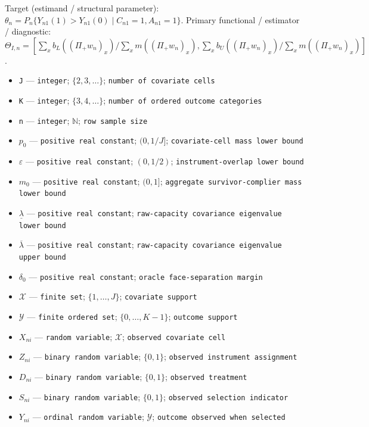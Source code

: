 \documentclass{article}
\begin{document}
Target (estimand / structural parameter): \(\theta_n=P_n\{Y_{n1}(1)>Y_{n1}(0)\mid C_{n1}=1,A_{n1}=1\}\).
Primary functional / estimator / diagnostic: \(\Theta_{I,n}=[\sum_x b_L((\Pi_+w_n)_x)/\sum_x m((\Pi_+w_n)_x),\sum_x b_U((\Pi_+w_n)_x)/\sum_x m((\Pi_+w_n)_x)]\).
\begin{itemize}
  \item \texttt{J} --- \texttt{integer}; \(\{2,3,\ldots\}\); \texttt{number of covariate cells}
  \item \texttt{K} --- \texttt{integer}; \(\{3,4,\ldots\}\); \texttt{number of ordered outcome categories}
  \item \texttt{n} --- \texttt{integer}; \(\mathbb N\); \texttt{row sample size}
  \item \(p_0\) --- \texttt{positive real constant}; \((0,1/J]\); \texttt{covariate-\allowbreak{}cell mass lower bound}
  \item \(\varepsilon\) --- \texttt{positive real constant}; \((0,1/2)\); \texttt{instrument-\allowbreak{}overlap lower bound}
  \item \(m_0\) --- \texttt{positive real constant}; \((0,1]\); \texttt{aggregate survivor-\allowbreak{}complier mass lower bound}
  \item \(\underline\lambda\) --- \texttt{positive real constant}; \texttt{raw-\allowbreak{}capacity covariance eigenvalue lower bound}
  \item \(\overline\lambda\) --- \texttt{positive real constant}; \texttt{raw-\allowbreak{}capacity covariance eigenvalue upper bound}
  \item \(\delta_0\) --- \texttt{positive real constant}; \texttt{oracle face-\allowbreak{}separation margin}
  \item \(\mathcal X\) --- \texttt{finite set}; \(\{1,\ldots,J\}\); \texttt{covariate support}
  \item \(\mathcal Y\) --- \texttt{finite ordered set}; \(\{0,\ldots,K-1\}\); \texttt{outcome support}
  \item \(X_{ni}\) --- \texttt{random variable}; \(\mathcal X\); \texttt{observed covariate cell}
  \item \(Z_{ni}\) --- \texttt{binary random variable}; \(\{0,1\}\); \texttt{observed instrument assignment}
  \item \(D_{ni}\) --- \texttt{binary random variable}; \(\{0,1\}\); \texttt{observed treatment}
  \item \(S_{ni}\) --- \texttt{binary random variable}; \(\{0,1\}\); \texttt{observed selection indicator}
  \item \(Y_{ni}\) --- \texttt{ordinal random variable}; \(\mathcal Y\); \texttt{outcome observed when selected}

\end{itemize}
\end{document}
